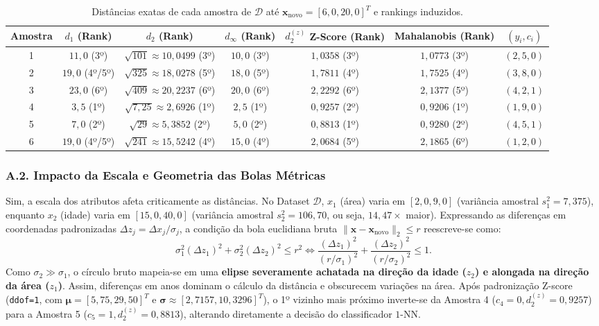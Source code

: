 \documentclass[11pt,a4paper]{article}
\begin{document}
\begin{table}[H]
\centering
\caption{Distâncias exatas de cada amostra de $\mathcal{D}$ até $\mathbf{x}_{\text{novo}} = [6{,}0, 20{,}0]^T$ e rankings induzidos.}
\label{tab:q1_dists}
\begin{tabular}{ccccccc}
\toprule
Amostra & $d_1$ (Rank) & $d_2$ (Rank) & $d_\infty$ (Rank) & $d_2^{(z)}$ Z-Score (Rank) & Mahalanobis (Rank) & $(y_i, c_i)$ \\
\midrule
1 & $11{,}0$ (3º) & $\sqrt{101} \approx 10{,}0499$ (3º) & $10{,}0$ (3º) & $1{,}0358$ (3º) & $1{,}0773$ (3º) & $(2{,}5, 0)$ \\
2 & $19{,}0$ (4º/5º) & $\sqrt{325} \approx 18{,}0278$ (5º) & $18{,}0$ (5º) & $1{,}7811$ (4º) & $1{,}7525$ (4º) & $(3{,}8, 0)$ \\
3 & $23{,}0$ (6º) & $\sqrt{409} \approx 20{,}2237$ (6º) & $20{,}0$ (6º) & $2{,}2292$ (6º) & $2{,}1377$ (5º) & $(4{,}2, 1)$ \\
4 & $3{,}5$ (1º) & $\sqrt{7{,}25} \approx 2{,}6926$ (1º) & $2{,}5$ (1º) & $0{,}9257$ (2º) & $0{,}9206$ (1º) & $(1{,}9, 0)$ \\
5 & $7{,}0$ (2º) & $\sqrt{29} \approx 5{,}3852$ (2º) & $5{,}0$ (2º) & $0{,}8813$ (1º) & $0{,}9280$ (2º) & $(4{,}5, 1)$ \\
6 & $19{,}0$ (4º/5º) & $\sqrt{241} \approx 15{,}5242$ (4º) & $15{,}0$ (4º) & $2{,}0684$ (5º) & $2{,}1865$ (6º) & $(1{,}2, 0)$ \\
\bottomrule
\end{tabular}
\end{table}

\subsubsection*{A.2. Impacto da Escala e Geometria das Bolas Métricas}
Sim, a escala dos atributos afeta criticamente as distâncias. No Dataset $\mathcal{D}$, $x_1$ (área) varia em $[2{,}0, 9{,}0]$ (variância amostral $s_1^2 = 7{,}375$), enquanto $x_2$ (idade) varia em $[15{,}0, 40{,}0]$ (variância amostral $s_2^2 = 106{,}70$, ou seja, $14{,}47\times$ maior). Expressando as diferenças em coordenadas padronizadas $\Delta z_j = \Delta x_j / \sigma_j$, a condição da bola euclidiana bruta $\|\mathbf{x} - \mathbf{x}_{\text{novo}}\|_2 \le r$ reescreve-se como:
\[
\sigma_1^2 (\Delta z_1)^2 + \sigma_2^2 (\Delta z_2)^2 \le r^2 \iff \frac{(\Delta z_1)^2}{(r/\sigma_1)^2} + \frac{(\Delta z_2)^2}{(r/\sigma_2)^2} \le 1.
\]
Como $\sigma_2 \gg \sigma_1$, o círculo bruto mapeia-se em uma \textbf{elipse severamente achatada na direção da idade ($z_2$) e alongada na direção da área ($z_1$)}. Assim, diferenças em anos dominam o cálculo da distância e obscurecem variações na área. Após padronização Z-score (\texttt{ddof=1}, com $\boldsymbol{\mu} = [5{,}75, 29{,}50]^T$ e $\boldsymbol{\sigma} \approx [2{,}7157, 10{,}3296]^T$), o 1º vizinho mais próximo inverte-se da Amostra 4 ($c_4=0, d_2^{(z)} = 0{,}9257$) para a Amostra 5 ($c_5=1, d_2^{(z)} = 0{,}8813$), alterando diretamente a decisão do classificador $1$-NN.
\end{document}
